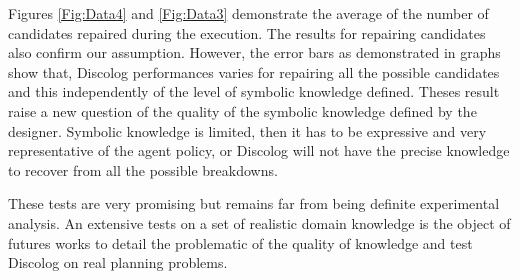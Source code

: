 \documentclass[conference]{IEEEtran}
\begin{document}
	\par  Figures \ref{Fig:Data4} and \ref{Fig:Data3} demonstrate the average of the number of candidates repaired during the execution. The results for repairing  candidates also confirm our assumption. However, the error bars as demonstrated in graphs show that, Discolog performances varies for repairing all the possible candidates and this independently of the level of symbolic knowledge defined. 	Theses result raise a new question of the quality of the symbolic knowledge defined by the designer. Symbolic knowledge is limited, then it has to be expressive and very representative of the agent policy, or Discolog will not have the precise knowledge to recover from all the possible breakdowns. 
	\par These tests are very promising but remains far from being definite experimental analysis. An extensive tests on a set of realistic domain knowledge is the object of futures works to detail the problematic of the quality of knowledge and test Discolog on real planning problems. 
	 	
	
	
	
\end{document}
